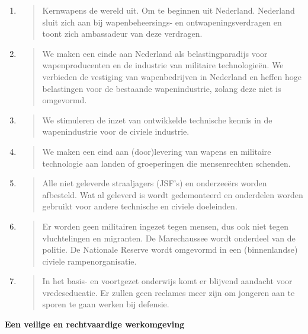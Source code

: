 \begin{enumerate}
\def\labelenumi{\arabic{enumi}.}
\item
  \begin{quote}
  Kernwapens de wereld uit. Om te beginnen uit Nederland. Nederland
  sluit zich aan bij wapenbeheersings- en ontwapeningsverdragen en toont
  zich ambassadeur van deze verdragen.
  \end{quote}
\item
  \begin{quote}
  We maken een einde aan Nederland als belastingparadijs voor
  wapenproducenten en de industrie van militaire technologieën. We
  verbieden de vestiging van wapenbedrijven in Nederland en heffen hoge
  belastingen voor de bestaande wapenindustrie, zolang deze niet is
  omgevormd.
  \end{quote}
\item
  \begin{quote}
  We stimuleren de inzet van ontwikkelde technische kennis in de
  wapenindustrie voor de civiele industrie.
  \end{quote}
\item
  \begin{quote}
  We maken een eind aan (door)levering van wapens en militaire
  technologie aan landen of groeperingen die mensenrechten schenden.
  \end{quote}
\item
  \begin{quote}
  Alle niet geleverde straaljagers (JSF's) en onderzeeërs worden
  afbesteld. Wat al geleverd is wordt gedemonteerd en onderdelen worden
  gebruikt voor andere technische en civiele doeleinden.
  \end{quote}
\item
  \begin{quote}
  Er worden geen militairen ingezet tegen mensen, dus ook niet tegen
  vluchtelingen en migranten. De Marechaussee wordt onderdeel van de
  politie. De Nationale Reserve wordt omgevormd in een (binnenlandse)
  civiele rampenorganisatie.
  \end{quote}
\item
  \begin{quote}
  In het basis- en voortgezet onderwijs komt er blijvend aandacht voor
  vredeseducatie. Er zullen geen reclames meer zijn om jongeren aan te
  sporen te gaan werken bij defensie.
  \end{quote}
\end{enumerate}

\textbf{Een veilige en rechtvaardige werkomgeving}

